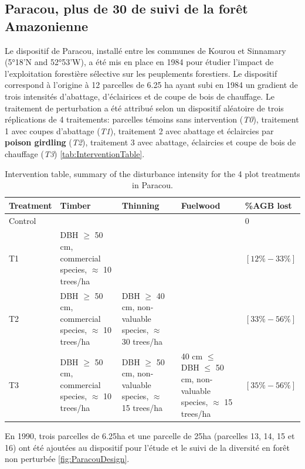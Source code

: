 \documentclass[
  11pt,
  french,
  A4paper,
  extrafontsizes,onecolumn,openright
  ]{memoir}
\begin{document}
\subsection{Paracou, plus de 30 de suivi de la forêt
Amazonienne}\label{paracou-plus-de-30-de-suivi-de-la-foret-amazonienne}

Le dispositif de Paracou, installé entre les communes de Kourou et
Sinnamary (5°18'N and 52°53'W), a été mis en place en 1984 pour étudier
l'impact de l'exploitation forestière sélective sur les peuplements
forestiers. Le dispositif correspond à l'origine à 12 parcelles de 6.25
ha ayant subi en 1984 un gradient de trois intensités d'abattage,
d'éclairices et de coupe de bois de chauffage. Le traitement de
perturbation a été attribué selon un dispositif aléatoire de trois
réplications de 4 traitements: parcelles témoins sans intervention
(\emph{T0}), traitement 1 avec coupes d'abattage (\emph{T1}), traitement
2 avec abattage et éclaircies par \textbf{poison girdling} (\emph{T2}),
traitement 3 avec abattage, éclaircies et coupe de bois de chauffage
(\emph{T3}) \ref{tab:InterventionTable}.

\begin{table}

\caption{\label{tab:Tab1}Intervention table, summary of the disturbance intensity for the 4 plot treatments in Paracou.}
\centering
\begin{tabu} to 
\toprule
Treatment & Timber & Thinning & Fuelwood & \%AGB lost\\
\midrule
Control &  &  &  & 0\\
T1 & DBH $\geq$ 50 cm, commercial species, $\approx$ 10 trees/ha &  &  & $[12\%-33\%]$\\
T2 & DBH $\geq$ 50 cm, commercial species, $\approx$ 10 trees/ha & DBH $\geq$ 40 cm, non-valuable species, $\approx$ 30 trees/ha &  & $[33\%-56\%]$\\
T3 & DBH $\geq$ 50 cm, commercial species, $\approx$ 10 trees/ha & DBH $\geq$ 50 cm, non-valuable species, $\approx$ 15 trees/ha & 40 cm $\leq$ DBH $\leq$ 50 cm, non-valuable species, $\approx$ 15 trees/ha & $[35\%-56\%]$\\
\bottomrule
\end{tabu}
\end{table}

En 1990, trois parcelles de 6.25ha et une parcelle de 25ha (parcelles
13, 14, 15 et 16) ont été ajoutées au dispositif pour l'étude et le
suivi de la diversité en forêt non perturbée \ref{fig:ParacouDesign}.
\end{document}
